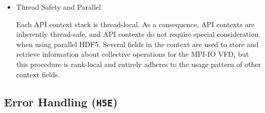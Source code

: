 \begin{itemize}
\item Thread Safety and Parallel

Each API context stack is thread-local. As a consequence, API contexts are inherently thread-safe, and API contexts do not require special consideration when using parallel HDF5. Several fields in the context are used to store and retrieve information about collective operations for the MPI-IO VFD, but this procedure is rank-local and entirely adheres to the usage pattern of other context fields.

\end{itemize}

\subsection{Error Handling (\texttt{H5E})}

